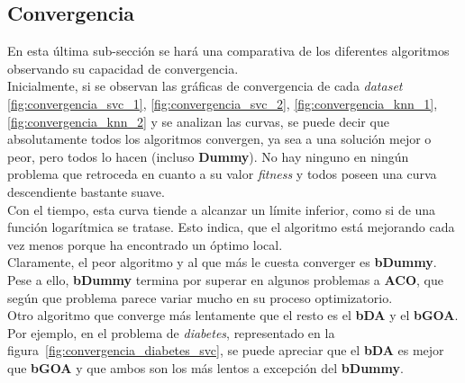 \clearpage

\subsection{Convergencia}
En esta última sub-sección se hará una comparativa de los diferentes algoritmos observando su capacidad de convergencia.\\[6pt]
Inicialmente, si se observan las gráficas de convergencia de cada \textit{dataset} \ref{fig:convergencia_svc_1}, \ref{fig:convergencia_svc_2}, \ref{fig:convergencia_knn_1}, \ref{fig:convergencia_knn_2} y se analizan las curvas, se puede decir que absolutamente todos los algoritmos convergen, ya sea a una solución mejor o peor, pero todos lo hacen (incluso \textbf{Dummy}). No hay ninguno en ningún problema que retroceda en cuanto a su valor \textit{fitness} y todos poseen una curva descendiente bastante suave.\\[6pt]
Con el tiempo, esta curva tiende a alcanzar un límite inferior, como si de una función logarítmica se tratase. Esto indica, que el algoritmo está mejorando cada vez menos porque ha encontrado un óptimo local.\\[6pt]
Claramente, el peor algoritmo y al que más le cuesta converger es \textbf{bDummy}. Pese a ello, \textbf{bDummy} termina por superar en algunos problemas a \textbf{ACO}, que según que problema parece variar mucho en su proceso optimizatorio.\\[6pt]
Otro algoritmo que converge más lentamente que el resto es el \textbf{bDA} y el \textbf{bGOA}. Por ejemplo, en el problema de \textit{diabetes}, representado en la figura~\ref{fig:convergencia_diabetes_svc}, se puede apreciar que el \textbf{bDA} es mejor que \textbf{bGOA} y que ambos son los más lentos a excepción del \textbf{bDummy}.

